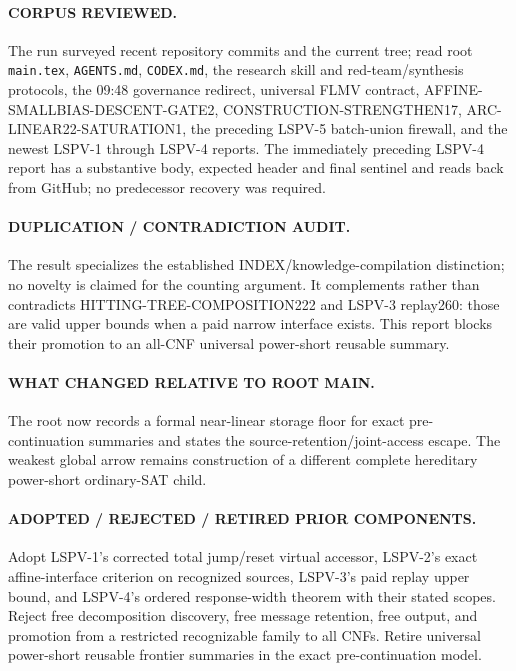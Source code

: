 \documentclass[11pt]{article}
\begin{document}
\paragraph{CORPUS REVIEWED.}
The run surveyed recent repository commits and the current tree; read root
\texttt{main.tex}, \texttt{AGENTS.md}, \texttt{CODEX.md}, the research skill and
red-team/synthesis protocols, the 09:48 governance redirect, universal FLMV
contract, AFFINE-SMALLBIAS-DESCENT-GATE2, CONSTRUCTION-STRENGTHEN17,
ARC-LINEAR22-SATURATION1, the preceding LSPV-5 batch-union firewall, and the
newest LSPV-1 through LSPV-4 reports.  The immediately preceding LSPV-4 report
has a substantive body, expected header and final sentinel and reads back from
GitHub; no predecessor recovery was required.

\paragraph{DUPLICATION / CONTRADICTION AUDIT.}
The result specializes the established INDEX/knowledge-compilation distinction;
no novelty is claimed for the counting argument.  It complements rather than
contradicts HITTING-TREE-COMPOSITION222 and LSPV-3 replay260: those are valid
upper bounds when a paid narrow interface exists.  This report blocks their
promotion to an all-CNF universal power-short reusable summary.

\paragraph{WHAT CHANGED RELATIVE TO ROOT MAIN.}
The root now records a formal near-linear storage floor for exact pre-
continuation summaries and states the source-retention/joint-access escape.  The
weakest global arrow remains construction of a different complete hereditary
power-short ordinary-SAT child.

\paragraph{ADOPTED / REJECTED / RETIRED PRIOR COMPONENTS.}
Adopt LSPV-1's corrected total jump/reset virtual accessor, LSPV-2's exact
affine-interface criterion on recognized sources, LSPV-3's paid replay upper
bound, and LSPV-4's ordered response-width theorem with their stated scopes.
Reject free decomposition discovery, free message retention, free output, and
promotion from a restricted recognizable family to all CNFs.  Retire universal
power-short reusable frontier summaries in the exact pre-continuation model.
\end{document}
